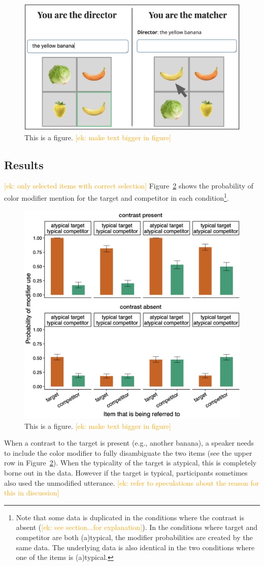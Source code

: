 \documentclass[10pt,letterpaper]{article}
\newcommand{\ek}[1]{\textcolor{Orange}{[ek: #1]}}
\begin{document}
\begin{figure}
	\begin{center}
		\includegraphics[width=.475\textwidth]{graphs/prod-design.pdf}
	\end{center}
\caption{This is a figure. \ek{make text bigger in figure}} 
\label{prod-results}
\end{figure}


\subsection{Results}
\ek{only selected items with correct selection}
Figure~\ref{prod-results} shows the probability of color modifier mention for the target and competitor in each condition\footnote{Note that some data is duplicated in the conditions where the contrast is absent (\ek{see section...for explanation}). In the conditions where target and competitor are both (a)typical, the modifier probabilities are created by the same data. The underlying data is also identical in the two conditions where one of the items is (a)typical.}. 

\begin{figure}
	\begin{center}
		\includegraphics[width=.45\textwidth]{graphs/prod-bycond-paper.pdf}
	\end{center}
\caption{This is a figure. \ek{make text bigger in figure}} 
\label{prod-results}
\end{figure}

When a contrast to the target is present (e.g., another banana), a speaker needs to include the color modifier to fully disambiguate the two items (see the upper row in Figure~\ref{prod-results}). When the typicality of the target is atypical, this is completely borne out in the data. However if the target is typical, participants sometimes also used the unmodified utterance. \ek{refer to speculations about the reason for this in discussion} 
\end{document}
